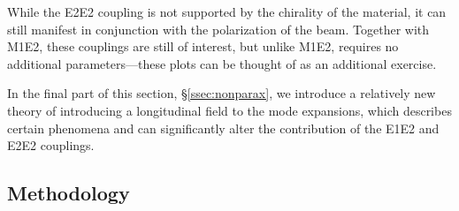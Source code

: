 \documentclass{article}
\begin{document}
\begin{onehalfspace}
	While the E2E2 coupling is not supported by the chirality of the material, it can still manifest in conjunction with the polarization of the beam. Together with M1E2, these couplings are still of interest, but unlike M1E2, requires no additional parameters---these plots can be thought of as an additional exercise.

	In the final part of this section, \S\ref{ssec:nonparax}, we introduce a relatively new theory of introducing a longitudinal field to the mode expansions, which describes certain phenomena and can significantly alter the contribution of the E1E2 and E2E2 couplings.

	\subsection{Methodology}\label{ssec:method}


\end{onehalfspace}
\end{document}
